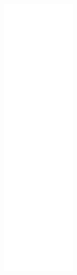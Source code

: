 \begin{figure}[H]
\begin{center}
\leavevmode
\includegraphics[height=400pt]{classDisconnectStateHandler__coll__graph}
\end{center}
\end{figure}
